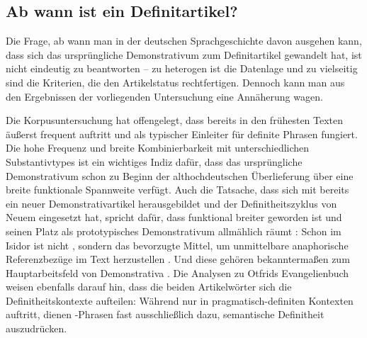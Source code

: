 \subsection{Ab wann ist  ein Definitartikel?}\label{sec:abwann}

Die Frage, ab wann man in der deutschen Sprachgeschichte davon ausgehen kann, dass sich das ursprüngliche Demonstrativum  zum Definitartikel gewandelt hat, ist nicht eindeutig zu beantworten -- zu heterogen ist die Datenlage und zu vielseitig sind die Kriterien, die den Artikelstatus rechtfertigen. Dennoch kann man aus den Ergebnissen der vorliegenden Untersuchung eine Annäherung wagen. 

Die Korpusuntersuchung hat offengelegt, dass  bereits in den frühesten Texten äußerst frequent auftritt und als typischer Einleiter für definite Phrasen fungiert. Die hohe Frequenz und breite Kombinierbarkeit mit unterschiedlichen Substantivtypes ist ein wichtiges Indiz dafür, dass das ursprüngliche Demonstrativum schon zu Beginn der althochdeutschen Überlieferung über eine breite funktionale Spannweite verfügt. Auch die Tatsache, dass sich mit  bereits ein neuer Demonstrativartikel herausgebildet und der Definitheitszyklus \parencite{Greenberg1978,vanGelderen2007} von Neuem eingesetzt hat, spricht dafür, dass  funktional breiter geworden ist und seinen Platz als prototypisches Demonstrativum allmählich räumt \parencite[ähnlich auch][]{Schlachter2012}: Schon im Isidor ist nicht , sondern   das bevorzugte Mittel, um unmittelbare anaphorische Referenzbezüge im Text herzustellen \parencite[139]{Oubouzar1989}. Und diese gehören bekanntermaßen zum Hauptarbeitsfeld von Demonstrativa  \parencite{Diessel1999}. Die Analysen zu Otfrids Evangelienbuch weisen ebenfalls darauf hin, dass die beiden Artikelwörter sich die Definitheitskontexte aufteilen: Während  nur in pragmatisch-definiten Kontexten auftritt, dienen -Phrasen fast ausschließlich dazu, semantische Definitheit auszudrücken. 


